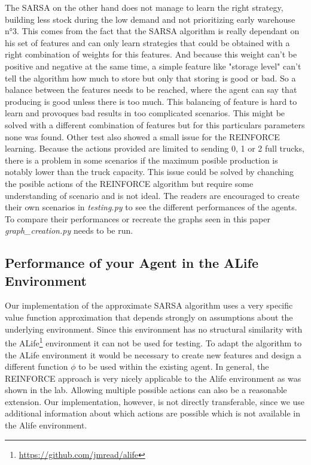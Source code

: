 \documentclass[journal, a4paper]{IEEEtran}
\theoremstyle{plain}
\theoremstyle{definition}
\begin{document}
The SARSA on the other hand does not manage to learn the right strategy, building less stock during the low demand and not prioritizing early warehouse n°3. This comes from the fact that the SARSA algorithm is really dependant on his set of features and can only learn strategies that could be obtained with a right combination of weights for this features. And because this weight can't be positive and negative at the same time, a simple feature like "storage level" can't tell the algorithm how much to store but only that storing is good or bad. So a balance between the features needs to be reached, where the agent can say that producing is good unless there is too much. This balancing of feature is hard to learn and provoques bad results in too complicated scenarios. This might be solved with a different combination of features but for this particulars parameters none was found.\newline
Other test also showed a small issue for the REINFORCE learning. Because the actions provided are limited to sending 0, 1 or 2 full trucks, there is a problem in some scenarios if the maximum posible production is notably lower than the truck capacity. This issue could be solved by chanching the posible actions of the REINFORCE algorithm but require some understanding of scenario and is not ideal. 
The readers are encouraged to create their own scenarios in \textit{testing.py} to see the different performances of the agents. To compare their performances or recreate the graphs seen in this paper \textit{graph\_creation.py} needs to be run.

 


\subsection{Performance of your Agent in the ALife Environment}
Our implementation of the approximate SARSA algorithm uses a very specific value function approximation that depends strongly on assumptions about the underlying environment. Since this environment has no structural similarity with the ALife\footnote{\url{https://github.com/jmread/alife}} environment it can not be used for testing. To adapt the algorithm to the ALife environment it would be necessary to create new features and design a different function $\phi$ to be used within the existing agent.
\newline
In general, the REINFORCE approach is very nicely applicable to the Alife environment as was shown in the lab. Allowing multiple possible actions can also be a reasonable extension. Our implementation, however, is not directly transferable, since we use additional information about which actions are possible which is not available in the Alife environment.
\end{document}
